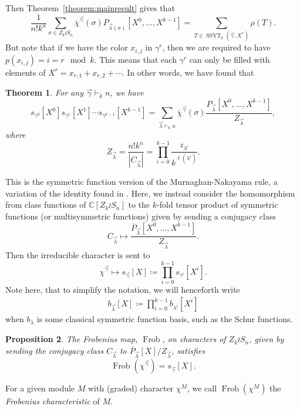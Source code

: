\documentclass[a4paper,12pt]{amsart}
\theoremstyle{plain}
\newtheorem{theorem}{Theorem}[section]
\newtheorem{proposition}[theorem]{Proposition}
\theoremstyle{definition}
\theoremstyle{remark}
\DeclareMathOperator{\Frob}{Frob}
\DeclareMathOperator{\SSYT}{SSYT}
\begin{document}
Then Theorem~\ref{theorem:mainresult} gives that 
\[ \frac{1}{n! k^n }
\sum_{\sigma \in Z_k \wr S_n} \overline{\chi}^{\vec{\gamma}}(\sigma) {{P}}_{\vec{\lambda}(\sigma)}[X^0,\dots, X^{k-1}] 
= \sum_{T \in \SSYT_k(\vec{\gamma}, X^{\ast})} \rho(T).
\]
But note that if we have the color $x_{i,j}$ in $\gamma^r$, then we are required to have $p(x_{i,j}) = i = r \mod k$. This means that each $\gamma^r$ can only be filled with elements of $X^r = x_{r,1} + x_{r,2} + \cdots$. In other words, we have found that
\begin{theorem}
For any $\vec{\gamma} \vdash_k n$, we have
\[ s_{\gamma^0}[X^0] s_{\gamma^1}[X^1] \cdots s_{\gamma^{k-1}}[X^{k-1}] = 
\sum_{\vec{\lambda} \vdash_k n} \overline{\chi}^{\vec{\gamma}}(\sigma) 
\frac{ {P}_{\vec{\lambda}}[X^0,\dots, X^{k-1}] }{ Z_{\vec{\lambda}} },
\]
where 
\[Z_{\vec{\lambda}} = \frac{n!k^n}{|C_{\vec{\lambda}}|} = 
 \prod_{i=0}^{k-1} \frac{z_{\lambda^i}}{k^{\ell(\lambda^i)}}.
\]

\end{theorem}

This is the symmetric function version of the Murnaghan-Nakayama rule, a variation of the identity found in \cite{MRW}. 
Here, we instead
consider the homomorphism from class functions of $\mathbb{C}[ Z_k \wr S_n ]$ to the $k$-fold tensor product of symmetric functions (or multisymmetric functions) given by sending a conjugacy class
\[
C_{\vec{\lambda}} \mapsto \frac{ \overline{P}_{\vec{\lambda}}[X^0,\dots, X^{k-1}]}{Z_{\vec{\lambda}}}.
\]
Then the irreducible character is sent to
\[
\chi^{\vec{\gamma}} \mapsto s_{\vec{\gamma}}[X] \coloneq \prod_{i=0}^{k-1} s_{\gamma^i}[X^i].
\]
Note here, that to simplify the notation, we will henceforth write
\begin{align*}
b_{\vec{\lambda}}[X] \coloneq \prod_{i=0}^{k-1} b_{\lambda^i}[X^i]
\end{align*}
when $b_\lambda$ is some classical symmetric function basis, such as the Schur functions.
\begin{proposition}
    The Frobenius map, $\Frob$, on characters of $Z_k \wr S_n$, given by
sending the conjugacy class $C_{\vec{\lambda}}$ to $\overline{P}_{\vec{\lambda}}[X]/Z_{\vec{\lambda}}$, satisfies
    \[
\Frob(\chi^{\vec{\gamma}}) = s_{\vec{\gamma}}[X].
    \]
\end{proposition}

\noindent For a given module $M$ with (graded) character $\chi^M$, we call $\Frob\left(\chi^M \right)$ the \emph{Frobenius characteristic} of $M$.
\end{document}
